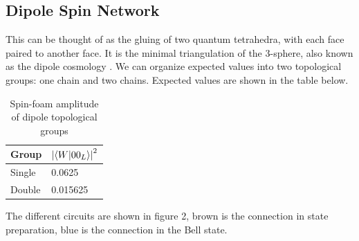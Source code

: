 \documentclass[a4paper,11pt,aps,tightenlines,nofootinbib]{revtex4}
\begin{document}
\subsection{Dipole Spin Network}
        This can be thought of as the gluing of two quantum tetrahedra, with each face paired to another face. It is the minimal triangulation of the 3-sphere, also known as the 
        dipole cosmology \cite{homogeneity-lqc}. We can organize expected values into two topological groups: one chain and two chains. Expected values are shown in the table below.         %
        \begin{table}[h]
        \begin{centering}
                \begin{tabular}{|l|l|}
                        \hline
                        Group & $ \abs{\bra{W}\ket{00_L}}^2$\\ \hline
                        Single & 0.0625 \\ \hline
                        Double & 0.015625 \\ \hline
                \end{tabular}
                \caption{Spin-foam amplitude of dipole topological groups}
        \end{centering}
        \end{table}

        The different circuits are shown in figure 2, 
        brown is the connection in state preparation, blue is the connection in the Bell state.
\end{document}

